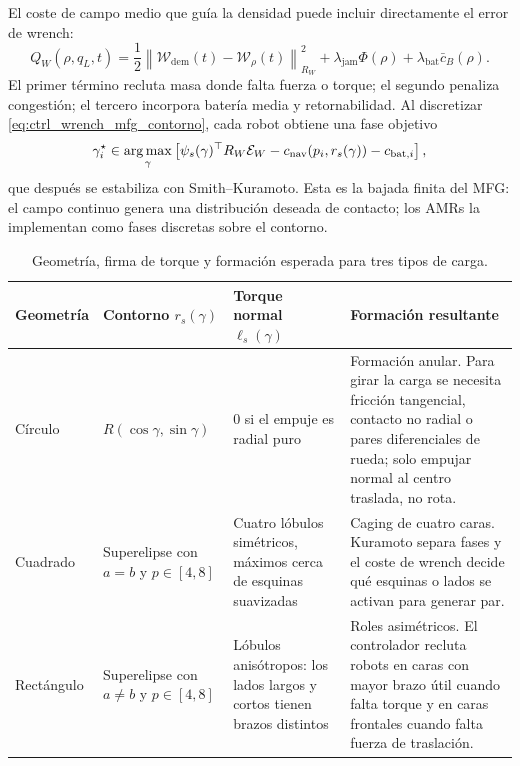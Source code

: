 El coste de campo medio que guía la densidad puede incluir directamente el error de
wrench:
\begin{equation}
  Q_W(\rho,q_L,t)
  =
  \frac{1}{2}
  \left\|
    \mathcal W_{\mathrm{dem}}(t)-\mathcal W_\rho(t)
  \right\|_{R_W}^{2}
  +
  \lambda_{\mathrm{jam}}\Phi(\rho)
  +
  \lambda_{\mathrm{bat}}\bar c_B(\rho).
  \label{eq:ctrl_coste_mfg_wrench}
\end{equation}
El primer término recluta masa donde falta fuerza o torque; el segundo penaliza
congestión; el tercero incorpora batería media y retornabilidad. Al discretizar
\eqref{eq:ctrl_wrench_mfg_contorno}, cada robot obtiene una fase objetivo
\begin{equation}
  \gamma_i^\star
  \in
  \operatorname*{arg\,max}_{\gamma}
  \left[
    \psi_s(\gamma)^\top R_W\mathcal E_W
    -
    c_{\mathrm{nav}}(p_i,r_s(\gamma))
    -
    c_{\mathrm{bat},i}
  \right],
  \label{eq:ctrl_fase_objetivo_mfg_wrench}
\end{equation}
que después se estabiliza con Smith--Kuramoto. Esta es la bajada finita del MFG: el
campo continuo genera una distribución deseada de contacto; los AMRs la implementan como
fases discretas sobre el contorno.

\begin{table}[H]
\centering
\caption{Geometría, firma de torque y formación esperada para tres tipos de carga.}
\label{tab:geometria-wrench-formacion}
\footnotesize
\begin{tabularx}{\textwidth}{@{}>{\raggedright\arraybackslash}p{}
>{\raggedright\arraybackslash}p{}
>{\raggedright\arraybackslash}p{}
>{\raggedright\arraybackslash}X@{}}
\toprule
Geometría & Contorno $r_s(\gamma)$ & Torque normal $\ell_s(\gamma)$ & Formación resultante \\
\midrule
Círculo &
$R(\cos\gamma,\sin\gamma)$ &
$0$ si el empuje es radial puro &
Formación anular. Para girar la carga se necesita fricción tangencial, contacto no radial
o pares diferenciales de rueda; solo empujar normal al centro traslada, no rota. \\
Cuadrado &
Superelipse con $a=b$ y $p\in[4,8]$ &
Cuatro lóbulos simétricos, máximos cerca de esquinas suavizadas &
Caging de cuatro caras. Kuramoto separa fases y el coste de wrench decide qué esquinas o
lados se activan para generar par. \\
Rectángulo &
Superelipse con $a\neq b$ y $p\in[4,8]$ &
Lóbulos anisótropos: los lados largos y cortos tienen brazos distintos &
Roles asimétricos. El controlador recluta robots en caras con mayor brazo útil cuando
falta torque y en caras frontales cuando falta fuerza de traslación. \\
\bottomrule
\end{tabularx}
\end{table}

